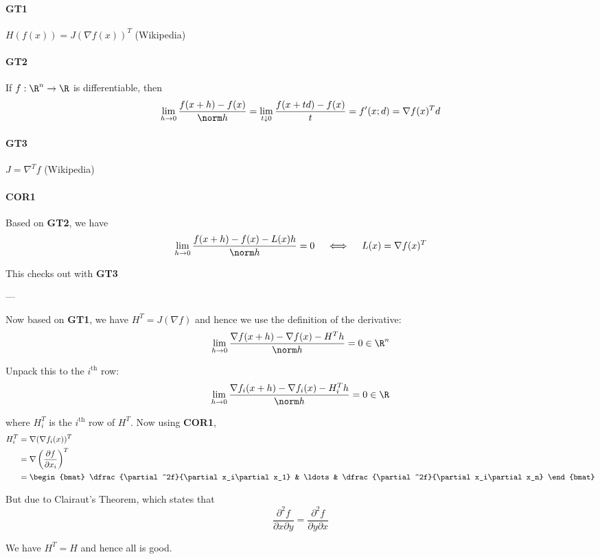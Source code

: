 \newpage

\paragraph{GT1} $H(f(x))=J(\nabla f(x))^T$ (Wikipedia)
\paragraph{GT2} If $f:\R^n\to\R$ is differentiable, then
$$
  \lim_{h\to0}\frac{f(x+h)-f(x)}{\norm h}
  =\lim_{t\downarrow0}\frac{f(x+td)-f(x)}t
  =f'(x;d)
  =\nabla f(x)^Td
$$
\paragraph{GT3} $J=\nabla^Tf$ (Wikipedia)

\paragraph{COR1} Based on \textbf{GT2}, we have
$$
  \lim_{h\to0}\frac{f(x+h)-f(x)-L(x)h}{\norm h}=0\quad\iff\quad L(x)=\nabla f(x)^T
$$

This checks out with \textbf{GT3}

---

Now based on \textbf{GT1}, we have $H^T=J(\nabla f)$ and hence we use the
definition of the derivative:
\begin{align*}
  \lim_{h\to0}\frac{\nabla f(x+h)-\nabla f(x)-H^Th}{\norm h}=0\in\R^n
\end{align*}

Unpack this to the $i^\text{th}$ row:
\begin{align*}
  \lim_{h\to0}\frac{\nabla f_i(x+h)-\nabla f_i(x)-H_i^Th}{\norm h}=0\in\R
\end{align*}

where $H_i^T$ is the $i^\text{th}$ row of $H^T$. Now using \textbf{COR1},
\begin{align*}
  H_i^T
   & =\nabla(\nabla f_i(x))^T                              \\
   & =\nabla\left(\frac{\partial f}{\partial x_i}\right)^T \\
   & =\begin{bmat}
        \dfrac{\partial^2f}{\partial x_i\partial x_1} &
        \ldots                                        &
        \dfrac{\partial^2f}{\partial x_i\partial x_n}
      \end{bmat}
\end{align*}

But due to Clairaut's Theorem, which states that
$$
  \frac{\partial^2f}{\partial x\partial y}=
  \frac{\partial^2f}{\partial y\partial x}
$$

We have $H^T=H$ and hence all is good.